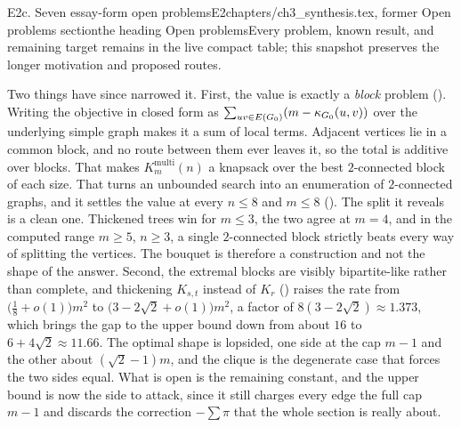 \begin{offcut}{E2c. Seven essay-form open problems}{E2}{chapters/ch3\_synthesis.tex, former Open problems section}{the heading Open problems}{Every problem, known result, and remaining target remains in the live compact table; this snapshot preserves the longer motivation and proposed routes.}
\begin{itemize}
Two things have since narrowed it. First, the value is exactly a \emph{block} problem (). Writing the objective in closed form as $\sum_{uv \in E(G_0)}(m - \kappa_{G_0}(u,v))$ over the underlying simple graph makes it a sum of local terms. Adjacent vertices lie in a common block, and no route between them ever leaves it, so the total is additive over blocks. That makes $K_m^{\mathrm{multi}}(n)$ a knapsack over the best $2$-connected block of each size. That turns an unbounded search into an enumeration of $2$-connected graphs, and it settles the value at every $n \le 8$ and $m \le 8$ (). The split it reveals is a clean one. Thickened trees win for $m \le 3$, the two agree at $m = 4$, and in the computed range $m \ge 5$, $n\ge3$, a single $2$-connected block strictly beats every way of splitting the vertices. The bouquet is therefore a construction and not the shape of the answer. Second, the extremal blocks are visibly bipartite-like rather than complete, and thickening $K_{s,t}$ instead of $K_r$ () raises the rate from $\bigl(\tfrac18+o(1)\bigr)m^2$ to $\bigl(3-2\sqrt{2}+o(1)\bigr)m^2$, a factor of $8(3-2\sqrt{2}) \approx 1.373$, which brings the gap to the upper bound down from about $16$ to $6+4\sqrt{2} \approx 11.66$. The optimal shape is lopsided, one side at the cap $m-1$ and the other about $(\sqrt2-1)m$, and the clique is the degenerate case that forces the two sides equal. What is open is the remaining constant, and the upper bound is now the side to attack, since it still charges every edge the full cap $m-1$ and discards the correction $-\sum \pi$ that the whole section is really about.

\end{itemize}
\end{offcut}
